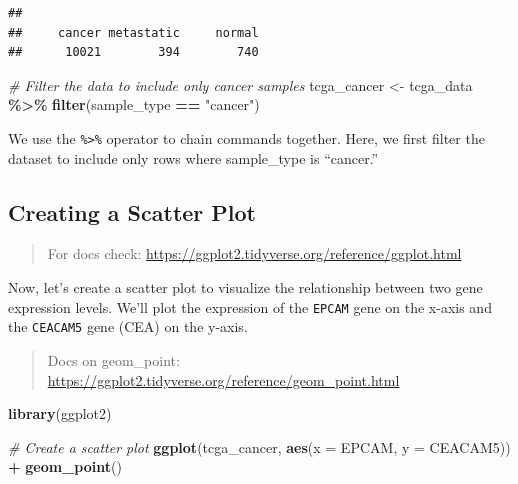 \documentclass[
]{book}
\newenvironment{Shaded}{\begin{snugshade}}{\end{snugshade}}
\newcommand{\AttributeTok}[1]{\textcolor[rgb]{0.13,0.29,0.53}{#1}}
\newcommand{\CommentTok}[1]{\textcolor[rgb]{0.56,0.35,0.01}{\textit{#1}}}
\newcommand{\FunctionTok}[1]{\textcolor[rgb]{0.13,0.29,0.53}{\textbf{#1}}}
\newcommand{\NormalTok}[1]{#1}
\newcommand{\OtherTok}[1]{\textcolor[rgb]{0.56,0.35,0.01}{#1}}
\newcommand{\SpecialCharTok}[1]{\textcolor[rgb]{0.81,0.36,0.00}{\textbf{#1}}}
\newcommand{\StringTok}[1]{\textcolor[rgb]{0.31,0.60,0.02}{#1}}
\begin{document}
\begin{verbatim}
## 
##     cancer metastatic     normal 
##      10021        394        740
\end{verbatim}

\begin{Shaded}
\begin{Highlighting}[]
\CommentTok{\# Filter the data to include only cancer samples}
\NormalTok{tcga\_cancer }\OtherTok{\textless{}{-}}\NormalTok{ tcga\_data }\SpecialCharTok{\%\textgreater{}\%}
  \FunctionTok{filter}\NormalTok{(sample\_type }\SpecialCharTok{==} \StringTok{"cancer"}\NormalTok{)}
\end{Highlighting}
\end{Shaded}

We use the \texttt{\%\textgreater{}\%} operator to chain commands together. Here, we first filter the dataset to include only rows where sample\_type is ``cancer.''

\hypertarget{creating-a-scatter-plot}{%
\subsection{Creating a Scatter Plot}\label{creating-a-scatter-plot}}

\begin{quote}
For docs check: \url{https://ggplot2.tidyverse.org/reference/ggplot.html}
\end{quote}

Now, let's create a scatter plot to visualize the relationship between two gene expression levels. We'll plot the expression of the \texttt{EPCAM} gene on the x-axis and the \texttt{CEACAM5} gene (CEA) on the y-axis.

\begin{quote}
Docs on geom\_point: \url{https://ggplot2.tidyverse.org/reference/geom_point.html}
\end{quote}

\begin{Shaded}
\begin{Highlighting}[]
\FunctionTok{library}\NormalTok{(ggplot2)}

\CommentTok{\# Create a scatter plot}
\FunctionTok{ggplot}\NormalTok{(tcga\_cancer, }\FunctionTok{aes}\NormalTok{(}\AttributeTok{x =}\NormalTok{ EPCAM, }\AttributeTok{y =}\NormalTok{ CEACAM5)) }\SpecialCharTok{+}
  \FunctionTok{geom\_point}\NormalTok{()}
\end{Highlighting}
\end{Shaded}
\end{document}
